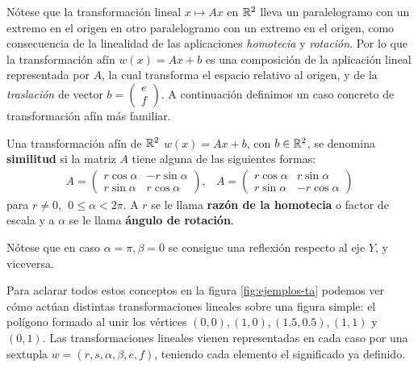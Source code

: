 Nótese que la transformación lineal $x\mapsto Ax$ en $\mathbb{R}^2$ lleva un paralelogramo con un extremo en el origen en otro paralelogramo con un extremo en el origen, como consecuencia de la linealidad de las aplicaciones \textit{homotecia} y \textit{rotación}. Por lo que la transformación afín $w(x)=Ax+b$ es una composición de la aplicación lineal representada por $A$, la cual transforma el espacio relativo al origen, y de la \textit{traslación} de vector $b=\begin{pmatrix} e \\ f\end{pmatrix}$. A continuación definimos un caso concreto de transformación afín más familiar.

\begin{definicion}
    Una transformación afín de $\mathbb{R}^2$ $w(x)=Ax+b$, con $b\in\mathbb{R}^2$, se denomina \textbf{similitud} si la matriz $A$ tiene alguna de las siguientes formas:
    \begin{eqnarray}
        A = \begin{pmatrix}
            r\cos\alpha & -r\sin\alpha \\
            r\sin\alpha & r\cos\alpha
        \end{pmatrix}
        , &
        A = \begin{pmatrix}
            r\cos\alpha & r\sin\alpha \\
            r\sin\alpha & -r\cos\alpha
        \end{pmatrix}
    \end{eqnarray}
    para $r\not= 0,\ \ 0\leq\alpha<2\pi$. A $r$ se le llama \textbf{razón de la homotecia} o factor de escala y a $\alpha$ se le llama \textbf{ángulo de rotación}.
\end{definicion}

Nótese que en caso $\alpha=\pi,\beta=0$ se consigue una reflexión respecto al eje $Y$, y viceversa.

Para aclarar todos estos conceptos en la figura \ref{fig:ejemplos-ta} podemos ver cómo actúan distintas transformaciones lineales sobre una figura simple: el polígono formado al unir los vértices $(0,0), (1,0), (1.5, 0.5), (1,1)$ y $(0,1)$. Las transformaciones lineales vienen representadas en cada caso por una sextupla $w=(r,s,\alpha,\beta,e,f)$, teniendo cada elemento el significado ya definido.

